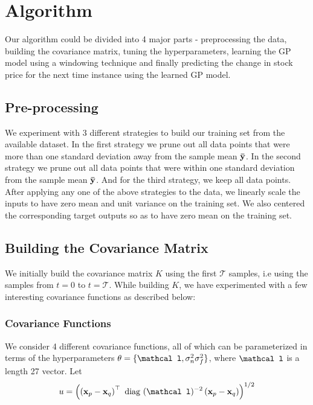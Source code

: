 \documentclass{article} %
\def\bfx{\mathbf x}
\def\bftheta{\mathbf \theta}
\def\bfl{\mathbf \mathcal l}
\def\diag{\mbox{ diag }}
\begin{document}



\section{Algorithm}

Our algorithm could be divided into 4 major parts - preprocessing the data, building the covariance matrix, tuning the hyperparameters, learning the GP model using a windowing technique and finally predicting the change in stock price for the next time instance using the learned GP model. 

\subsection{Pre-processing}
\label{sec:strategy}

We experiment with 3 different strategies to build our training set from the available dataset. In the first strategy we prune out all data points that were more than one standard deviation away from the sample mean $\bf\bar{y}$. In the second strategy we prune out all data points that were within one standard deviation from the sample mean $\bf\bar{y}$. And for the third strategy, we keep all data points. After applying any one of the above strategies to the data, we linearly scale the inputs to have zero mean and unit variance on the training set. We also centered the corresponding target outputs so as to have zero mean on the training set.

\subsection{Building the Covariance Matrix}

We initially build the covariance matrix $K$ using the first $\mathcal{T}$ samples, i.e using the samples from $t = 0$ to $t = \mathcal{T}$. While building $K$, we have experimented with a few interesting covariance functions as described below:  

\subsubsection{Covariance Functions}
We consider 4 different covariance functions, all of which can be parameterized in terms of the hyperparameters $\bftheta = \{\bfl, \sigma_n^2 \sigma_f^2\}$, where $\bfl$ is a length 27 vector.
Let
\begin{equation}
	u = \left( \left( \bfx_p - \bfx_q \right)^\top \diag(\bfl)^{-2} \left( \bfx_p - \bfx_q \right) \right)^{1/2}
\end{equation}
\end{document}

